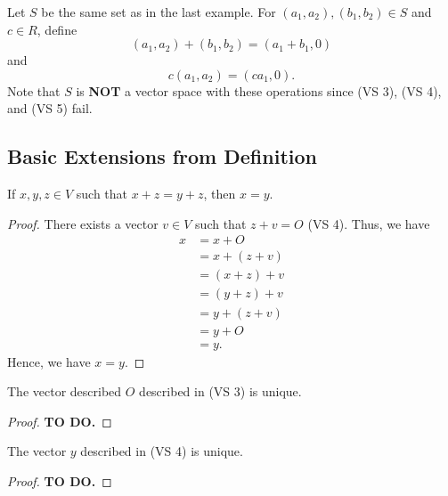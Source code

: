 \begin{eg}
    Let \( S  \) be the same set as in the last example. For \( (a_{1}, a_{2} ) , (b_{1}, b_{2}) \in S  \) and \( c \in R  \), define 
    \[  (a_{1}, a_{2} ) + (b_{1} , b_{2})  = ( a_{1} + b_{1} , 0 ) \]
    and 
    \[  c(a_{1}, a_{2}) = (ca_{1}, 0 ). \]
    Note that \( S  \) is \textbf{NOT} a vector space with these operations since (VS 3), (VS 4), and (VS 5) fail.
\end{eg}

\subsection{Basic Extensions from Definition}

\begin{theorem}
    If \( x,y,z \in V  \) such that \( x + z = y + z  \), then \( x = y  \).
\end{theorem}
\begin{proof}
There exists a vector \( v \in V  \) such that \( z + v = O  \) (VS 4). Thus, we have
    \begin{align*}
        x &= x + O  \\
            &= x + (z + v ) \\
            &= (x+ z) + v  \\
            &= (y+z) + v \\
            &= y + (z + v) \\
            &= y + O \\ 
            &= y.
    \end{align*}
    Hence, we have \( x = y  \).
\end{proof}

\begin{corollary}
    The vector described \( O  \) described in (VS 3) is unique.
\end{corollary}
\begin{proof}
\textbf{TO DO.}
\end{proof}

\begin{corollary}
   The vector \( y  \) described in (VS 4) is unique. 
\end{corollary}
\begin{proof}
\textbf{TO DO.}
\end{proof}



